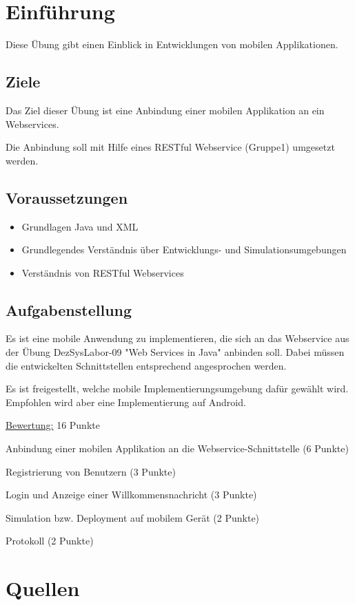 
\section{Einführung}
Diese Übung gibt einen Einblick in Entwicklungen von mobilen Applikationen.

\subsection{Ziele}
Das Ziel dieser Übung ist eine Anbindung einer mobilen Applikation an ein Webservices.

Die Anbindung soll mit Hilfe eines RESTful Webservice (Gruppe1) umgesetzt werden.


\subsection{Voraussetzungen}
\begin{itemize}
\item Grundlagen Java und XML
\item Grundlegendes Verständnis über Entwicklungs- und Simulationsumgebungen
\item Verständnis von RESTful Webservices
\end{itemize}


\subsection{Aufgabenstellung}
Es ist eine mobile Anwendung zu implementieren, die sich an das Webservice aus der Übung DezSysLabor-09 "Web Services in Java" anbinden soll. Dabei müssen die entwickelten Schnittstellen entsprechend angesprochen werden.

Es ist freigestellt, welche mobile Implementierungsumgebung dafür gewählt wird. Empfohlen wird aber eine Implementierung auf Android.
\newline

\uline{Bewertung:} 16 Punkte
\begin{list}{-}
\item Anbindung einer mobilen Applikation an die Webservice-Schnittstelle (6 Punkte)
\item Registrierung von Benutzern (3 Punkte)
\item Login und Anzeige einer Willkommensnachricht (3 Punkte)
\item Simulation bzw. Deployment auf mobilem Gerät (2 Punkte)
\item Protokoll (2 Punkte)
\end{list}

\section{Quellen}
\label{sec:Quellen}
\cite{RESTWebservice, DezSys09Paul}

\clearpage
